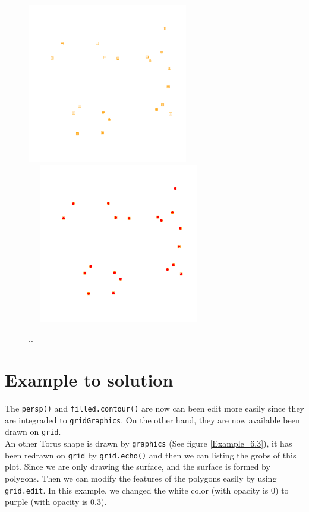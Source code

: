 \documentclass[paper=a4, fontsize=11pt]{report}
\begin{document}
\begin{figure}[h]
\begin{center}
  \includegraphics[height = 7cm, width = 7cm]{figure/Chapter6_example_1.pdf}
  \includegraphics[height = 7cm, width = 8cm]{figure/Chapter6_example_2.pdf}
  \caption{..}
  	\label{Example_6.0}
\end{center}
\end{figure}

\section{Example to solution}
The \texttt{persp()} and \texttt{filled.contour()} are now can been edit more easily since they are integraded to \texttt{gridGraphics}. On the other hand, they are now available been drawn on \texttt{grid}.\\

An other Torus shape is drawn by \texttt{graphics} (See figure \ref{Example_6.3}), it has been redrawn on \texttt{grid} by \texttt{grid.echo()} and then we can listing the grobs of this plot. Since we are only drawing the surface, and the surface is formed by polygons. Then we can modify the features of the polygons easily by using \texttt{grid.edit}. In this example, we changed the white color (with opacity is 0) to purple (with opacity is 0.3).\\
\end{document}
